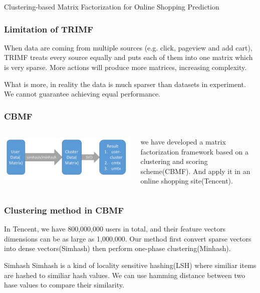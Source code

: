 \documentclass[xetex,mathserif,serif]{beamer}
\begin{document}
\begin{section}{Clustering-based Matrix Factorization for Online Shopping Prediction}
  \begin{frame}
    \frametitle{Limitation of TRIMF}
    \par{ When data are coming from multiple sources (e.g. click, pageview and add cart), TRIMF treats every source equally and puts each of them into one matrix which is very sparse. More actions will produce more matrices, increasing complexity.}
    \par{What is more, in reality the data is much sparser than datasets in experiment. We cannot guarantee achieving equal performance.}
  \end{frame}
  \begin{frame}
    \frametitle{CBMF}
    \begin{columns}
      \begin{column}{0.6\textwidth}
        \includegraphics[width=\textwidth]{fig/d.jpg}
      \end{column}
      \begin{column}{0.35\textwidth}
        we have developed a matrix factorization framework based on a clustering and scoring scheme(CBMF). And apply it in an online shopping site(Tencent).
      \end{column}
    \end{columns}
  \end{frame}
  \begin{frame}
    \frametitle{Clustering method in CBMF}
    In Tencent, we have 800,000,000 users in total, and their feature vectors dimensions can be as large as 1,000,000. Our method first convert sparse vectors into dense vectors(Simhash) then perform one-phase clustering(Minhash).
    \begin{block}{Simhash}
      Simhash is a kind of locality sensitive hashing(LSH) where similiar items are hashed to similiar hash values. We can use \alert{hamming distance} between two hase values to compare their similarity.
    \end{block}


\end{frame}
\end{section}
\end{document}
